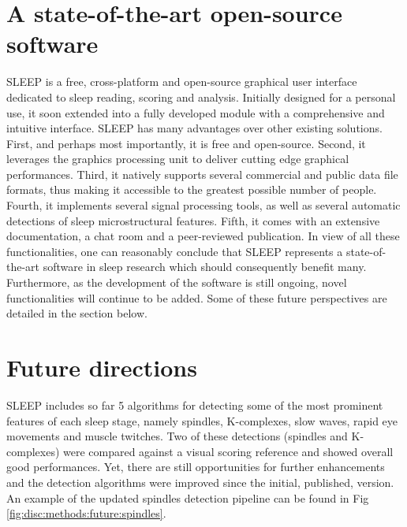 \section{A state-of-the-art open-source software}
\label{disc:methods:software}

SLEEP is a free, cross-platform and open-source graphical user interface dedicated to sleep reading, scoring and analysis. Initially designed for a personal use, it soon extended into a fully developed module with a comprehensive and intuitive interface. SLEEP has many advantages over other existing solutions. First, and perhaps most importantly, it is free and open-source. Second, it leverages the graphics processing unit to deliver cutting edge graphical performances. Third, it natively supports several commercial and public data file formats, thus making it accessible to the greatest possible number of people. Fourth, it implements several signal processing tools, as well as several automatic detections of sleep microstructural features. Fifth, it comes with an extensive documentation, a chat room and a peer-reviewed publication. In view of all these functionalities, one can reasonably conclude that SLEEP represents a state-of-the-art software in sleep research which should consequently benefit many. Furthermore, as the development of the software is still ongoing, novel functionalities will continue to be added. Some of these future perspectives are detailed in the section below.

\section{Future directions}
\label{disc:methods:future}

SLEEP includes so far 5 algorithms for detecting some of the most prominent features of each sleep stage, namely spindles, K-complexes, slow waves, rapid eye movements and muscle twitches. Two of these detections (spindles and K-complexes) were compared against a visual scoring reference and showed overall good performances. Yet, there are still opportunities for further enhancements and the detection algorithms were improved since the initial, published, version. An example of the updated spindles detection pipeline can be found in Fig \ref{fig:disc:methods:future:spindles}.

